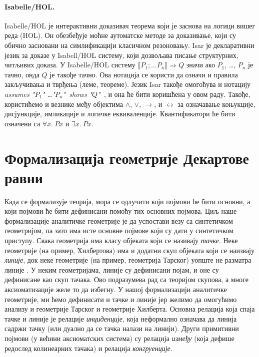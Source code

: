 \paragraph{ Isabelle/HOL.}  Isabelle/HOL је интерактивни
доказивач теорема који је заснова на логици вишег реда (HOL).  Он
обезбеђује моћне аутоматске методе за доказивање, који су обично
засновани на симлификацији класичном резоновању. Isar је декларативни
језик за доказе у Isabell/HOL систему, који дозвољава писање
структурних, читљивих доказа. У Isabelle/HOL систему $\llbracket P_1;
\ldots P_n \rrbracket \Longrightarrow Q$ значи ако $P_1$, \ldots,
$P_n$ је тачно, онда $Q$ је такође тачно. Ова нотација се користи да
означи и правила закључивања и тврђења (леме, теореме).  Језик Isar
такође омогоћува и нотацију {\em assumes "$P_1$" \ldots "$P_n$"\ shows
  "$Q$"\ }, и она ће бити коришћена у овом раду. Такође, користићемо и
везнике међу објектима $\wedge$, $\vee$, $\longrightarrow$, и
$\longleftrightarrow$ за означавање коњукције, дисјункције, имликације
и логичке еквиваленције. Квантификатори ће бити означени са $\forall
x.\ P x$ и $\exists x.\ P x$.

\section{Формализација геометрије Декартове равни}
\label{sec:cartesian}

Када се формализује теорија, мора се одлучити који појмови ће бити
основни, а који појмови ће бити дефинисани помоћу тих основних
појмова. Циљ наше формализације аналитичке геометрије је да успостави
везу са синтетичком геометријом, па зато има исте основне појмове који
су дати у синтетичком приступу. Свака геометрија има класу објеката
који се називају \emph{тачке}. Неке геометрије (на пример, Хилбертова)
има и додатни скуп објеката који се наизвају \emph{линије}, док неке
геометрије (на пример, геометрија Тарског) уопште не разматра линије .
У неким геометријама, линије су дефинисани појам, и оне су дефинисане
као скуп тачака.  Ово подразумева рад са теоријом скупова, а многе
аксиоматизације желе то да избегну.  У нашој формализацији аналитичке
геометрије, ми ћемо дефинисати и тачке и линије јер желимо да
омогућимо анализу и геометрије Тарског и геометрије Хилберта. Основна
релација која спаја тачке и линије је релације \emph{инциденције},
која неформално означава да линија садржи тачку (или дуално да се
тачка налази на линији). Други примитивни појмови (у већини
аксиоматских система) су релација \emph{између} (која дефише редослед
колинеарних тачака) и релација \emph{конгруенције}.

